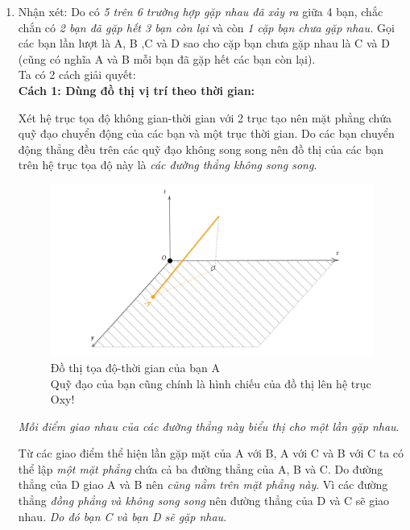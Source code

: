 \begin{enumerate}
\item Nhận xét: Do có \textit{5 trên 6 trường hợp gặp nhau đã xảy ra} giữa 4 bạn, chắc chắn có \textit{2 bạn đã gặp hết 3 bạn còn lại} và còn \textit{1 cặp bạn chưa gặp nhau.}
Gọi các bạn lần lượt là A, B ,C và D sao cho cặp bạn chưa gặp nhau là C và D (cũng có nghĩa A và B mỗi bạn đã gặp hết các bạn còn lại).\\

Ta có 2 cách giải quyết:\\

\textbf{Cách 1: Dùng đồ thị vị trí theo thời gian:}

Xét hệ trục tọa độ không gian-thời gian với 2 trục tạo nên mặt phẳng chứa quỹ đạo chuyển động của các bạn và một trục thời gian. Do các bạn chuyển động thẳng đều trên các quỹ đạo không song song nên đồ thị của các bạn trên hệ trục tọa độ này là \textit{các đường thẳng không song song}.
\setcounter{figure}{0}
\begin{figure}[H]
\centering
\includegraphics[scale = 0.25]{Problem_1/Image/Cach 1_A.png}
\captionsetup{justification=centering}
\caption{Đồ thị tọa độ-thời gian của bạn A \\
Quỹ đạo của bạn cũng chính là hình chiếu của đồ thị lên hệ trục Oxy!}
\end{figure}

\textit{Mỗi điểm giao nhau của các đường thẳng này biểu thị cho một lần gặp nhau}.

Từ các giao điểm thể hiện lần gặp mặt của A với B, A với C và B với C ta có thể lập \textit{một mặt phẳng} chứa cả ba đường thẳng của A, B và C. Do đường thẳng của D giao A và B nên \textit{cũng nằm trên mặt phẳng này}. 
Vì các đường thẳng \textit{đồng phẳng và không song song} nên đường thẳng của D và C sẽ giao nhau. \textit{Do đó bạn C và bạn D sẽ gặp nhau}.


\end{enumerate}
